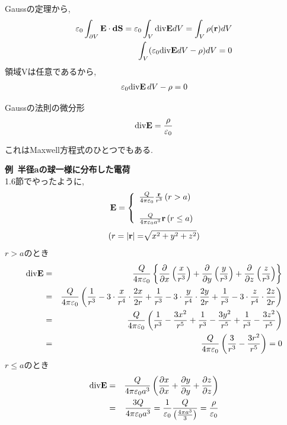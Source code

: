 \documentclass{jsarticle}
\begin{document}
Gaussの定理から,
\begin{eqnarray}
\varepsilon_0 \int_{\partial V}^{}{\bf E}\cdot {\bf dS} = \varepsilon_0 \int_{V}^{}{\rm div}{\bf E}dV = \int_{V}^{}\rho({\bf r})dV \\
\int_{V}^{} ( \varepsilon_0{\rm div}{\bf E}dV - \rho ) dV =0
\end{eqnarray}
領域Vは任意であるから,
\begin{eqnarray}
\varepsilon_0{\rm div}{\bf E}\,dV - \rho =0
\end{eqnarray}

\begin{itembox}[c]{Gaussの法則の微分形}
\begin{eqnarray}
{\rm div}{\bf E}=\frac{\rho}{\varepsilon_0}
\end{eqnarray}
\end{itembox}
これはMaxwell方程式のひとつでもある.


{\bf 例\, 半径aの球一様に分布した電荷}\\
1.6節でやったように,\\
\begin{equation}
{\bf E}=
\left \{
\begin{array}{l}
\frac{Q}{4 \pi \varepsilon_0}\frac{{\bf r}}{r^3} \, (r > a)\\
\\
\frac{Q}{4 \pi \varepsilon_0 a^3}{\bf r} \, (r \leq a)
\end{array}
\right.
\end{equation}
\begin{equation}
(r=|{\bf r}|=\sqrt[]{\mathstrut x^2+y^2+z^2})
\end{equation}
$r > a$のとき\\
\begin{eqnarray}
{\rm div}{\bf E}&=&\frac{Q}{4 \pi \varepsilon_0} \left\{\frac{\partial}{\partial x}\left(\frac{x}{r^3}\right)+\frac{\partial}{\partial y}\left(\frac{y}{r^3}\right)+\frac{\partial}{\partial z}\left(\frac{z}{r^3}\right) \right\} \\
&=&\frac{Q}{4 \pi \varepsilon_0} \left( \frac{1}{r^3}-3 \cdot \frac{x}{r^4} \cdot \frac{2x}{2r}+\frac{1}{r^3}-3 \cdot \frac{y}{r^4} \cdot \frac{2y}{2r}+\frac{1}{r^3}-3 \cdot \frac{z}{r^4} \cdot \frac{2z}{2r} \right) \\
&=&\frac{Q}{4 \pi \varepsilon_0} \left( \frac{1}{r^3}-\frac{3x^2}{r^5}+\frac{1}{r^3}-\frac{3y^2}{r^5}+\frac{1}{r^3}-\frac{3z^2}{r^5} \right) \\
&=&\frac{Q}{4 \pi \varepsilon_0} \left( \frac{3}{r^3}-\frac{3r^2}{r^5} \right) = 0
\end{eqnarray}
$r \leq a$のとき\\
\begin{eqnarray}
{\rm div}{\bf E}&=&\frac{Q}{4 \pi \varepsilon_0 a^3} \left( \frac{\partial x}{\partial x}+\frac{\partial y}{\partial y}+\frac{\partial z}{\partial z} \right)\\
&=&\frac{3Q}{4 \pi \varepsilon_0 a^3}=\frac{1}{\varepsilon_0}\frac{Q}{\left( \frac{4 \pi a^3}{3} \right)}=\frac{\rho}{\varepsilon_0}
\end{eqnarray}
\end{document}

